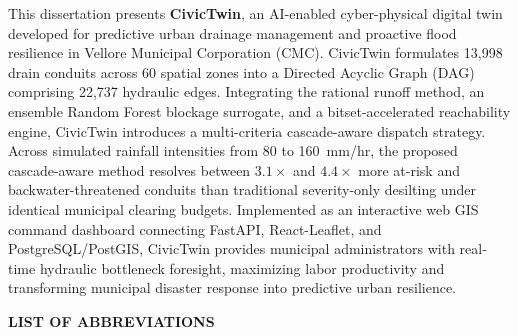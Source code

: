\documentclass[12pt,a4paper]{report}
\begin{document}
This dissertation presents \textbf{CivicTwin}, an AI-enabled cyber-physical digital twin developed for predictive urban drainage management and proactive flood resilience in Vellore Municipal Corporation (CMC). CivicTwin formulates 13,998 drain conduits across 60 spatial zones into a Directed Acyclic Graph (DAG) comprising 22,737 hydraulic edges. Integrating the rational runoff method, an ensemble Random Forest blockage surrogate, and a bitset-accelerated reachability engine, CivicTwin introduces a multi-criteria cascade-aware dispatch strategy. Across simulated rainfall intensities from 80 to 160~mm/hr, the proposed cascade-aware method resolves between $3.1\times$ and $4.4\times$ more at-risk and backwater-threatened conduits than traditional severity-only desilting under identical municipal clearing budgets. Implemented as an interactive web GIS command dashboard connecting FastAPI, React-Leaflet, and PostgreSQL/PostGIS, CivicTwin provides municipal administrators with real-time hydraulic bottleneck foresight, maximizing labor productivity and transforming municipal disaster response into predictive urban resilience.

\clearpage



\tableofcontents
\clearpage

\listoffigures
\clearpage

\listoftables
\clearpage

\thispagestyle{plain}
\begin{center}
    {\fontsize{14pt}{18pt}\selectfont \textbf{LIST OF ABBREVIATIONS}\par}
\end{center}
\vspace{0.8cm}
\end{document}
